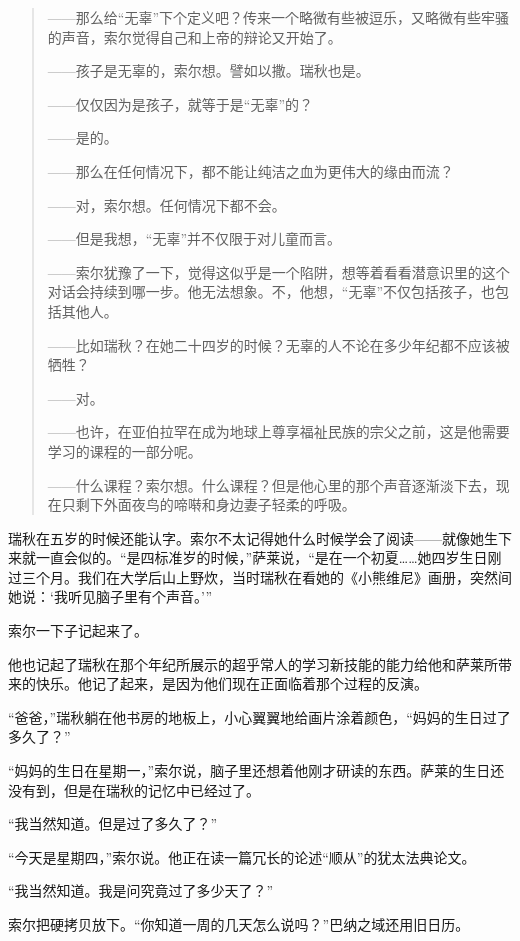 \documentclass[AutoFakeBold=true]{book}
\begin{document}
\begin{quotation}
	{\kaishu ——那么给``无辜''下个定义吧？}传来一个略微有些被逗乐，又略微有些牢骚的声音，索尔觉得自己和上帝的辩论又开始了。

	{\kaishu ——孩子是无辜的，}索尔想。譬如以撒。瑞秋也是。

	{\kaishu ——仅仅因为是孩子，就等于是``无辜''的？}

	——是的。

	{\kaishu ——那么在任何情况下，都不能让纯洁之血为更伟大的缘由而流？}

	——对，索尔想。任何情况下都不会。

	{\kaishu ——但是我想，``无辜''并不仅限于对儿童而言。}

	——索尔犹豫了一下，觉得这似乎是一个陷阱，想等着看看潜意识里的这个对话会持续到哪一步。他无法想象。不，他想，``无辜''不仅包括孩子，也包括其他人。

	{\kaishu ——比如瑞秋？在她二十四岁的时候？无辜的人不论在多少年纪都不应该被牺牲？}

	——对。

	{\kaishu ——也许，在亚伯拉罕在成为地球上尊享福祉民族的宗父之前，这是他需要学习的课程的一部分呢。}

	——什么课程？索尔想。什么课程？但是他心里的那个声音逐渐淡下去，现在只剩下外面夜鸟的啼啭和身边妻子轻柔的呼吸。
\end{quotation}

瑞秋在五岁的时候还能认字。索尔不太记得她什么时候学会了阅读——就像她生下来就一直会似的。``是四标准岁的时候，''萨莱说，``是在一个初夏……她四岁生日刚过三个月。我们在大学后山上野炊，当时瑞秋在看她的《小熊维尼》画册，突然间她说：`我听见脑子里有个声音。'''

索尔一下子记起来了。

他也记起了瑞秋在那个年纪所展示的超乎常人的学习新技能的能力给他和萨莱所带来的快乐。他记了起来，是因为他们现在正面临着那个过程的反演。

``爸爸，''瑞秋躺在他书房的地板上，小心翼翼地给画片涂着颜色，``妈妈的生日过了多久了？''

``妈妈的生日在星期一，''索尔说，脑子里还想着他刚才研读的东西。萨莱的生日还没有到，但是在瑞秋的记忆中已经过了。

``我当然知道。但是过了多久了？''

``今天是星期四，''索尔说。他正在读一篇冗长的论述``顺从''的犹太法典论文。

``我当然知道。我是问究竟过了多少天了？''

索尔把硬拷贝放下。``你知道一周的几天怎么说吗？''巴纳之域还用旧日历。
\end{document}
